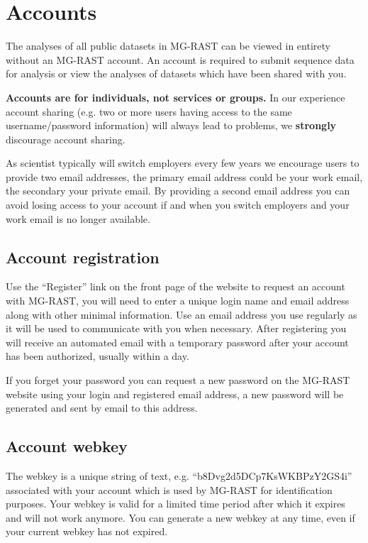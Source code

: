 \documentclass[12pt,fullpage]{report}
\begin{document}
\section{Accounts}

The analyses of all public datasets in MG-RAST can be viewed in entirety without an MG-RAST account. An account is required to submit sequence data
for analysis or view the analyses of datasets which have been shared with you.

\textbf{Accounts are for individuals, not services or groups.} In our experience account sharing (e.g. two or more users having access to the same username/password information) will always lead to problems, we \textbf{strongly} discourage account sharing.

As scientist typically will switch employers every few years we encourage users to provide two email addresses, the primary email address could be your work email, the secondary your private email. By providing a second email address you can avoid losing access to your account if and when you switch employers and your work email is no longer available.

\subsection*{Account registration}
Use the ``Register'' link on the front page of the website to request an account with MG-RAST, you will need to enter a unique login name and email address
along with other minimal information. Use an email address you use regularly as it will be used to communicate with you when necessary. After registering
you will receive an automated email with a temporary password after your account has been authorized, usually within a day.

If you forget your password you can request a new password on the MG-RAST website using your login and registered email address, a new password will
be generated and sent by email to this address.
\subsection*{Account webkey}
\label{section:webkey}
The webkey is a unique string of text, e.g. ``b8Dvg2d5DCp7KsWKBPzY2GS4i'' associated with your account which is used by MG-RAST for identification
purposes. Your webkey is valid for a limited time period after which it expires and will not work anymore. You can generate a new webkey at any time, even if your current webkey has not expired.
\end{document}
